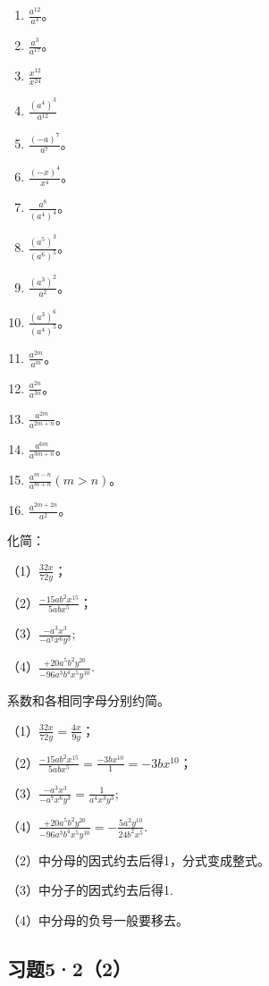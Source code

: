 \begin{enumerate}[start=1]
\item
  \(\frac{a^{12}}{a^4}\)。
\item
  \(\frac{a^3}{a^{17}}\)。
\item
  \(\frac{x^{12}}{x^{24}}\)
\item
  \(\frac{(a^4)^3}{a^{12}}\)
\item
  \(\frac{(-a)^7}{a^7}\)。
\item
  \(\frac{(-x)^4}{x^4}\)。
\item
  \(\frac{a^8}{(a^4)^4}\)。
\item
  \(\frac{(a^5)^3}{(a^6)^5}\)。
\item
  \(\frac{(a^3)^2}{a^2}\)。
\item
  \(\frac{(a^3)^6}{(a^4)^5}\)。
\item
  \(\frac{a^{2m}}{a^m}\)。
\item
  \(\frac{a^{2n}}{a^{3n}}\)。
\item
  \(\frac{a^{2m}}{a^{2m+n}}\)。
\item
  \(\frac{a^{6m}}{a^{3m+n}}\)。
\item
  \(\frac{a^{m - n}}{a^{m + n}} (m > n)\)。
\item
  \(\frac{a^{2m + 2n}}{a^2}\)。
\end{enumerate}

 化简：

（1）\(\frac{32x}{72y}\)；

（2）\(\frac{-15ab^2x^{15}}{5abx^5}\)；

（3）\(\frac{-a^3x^3}{-a^7x^6y^3};\)

（4）\(\frac{+20a^{5}b^{2}y^{20}}{-96a^{3}b^{4}x^{5}y^{10}}.\)

 系数和各相同字母分别约简。

 （1）\(\frac{32x}{72y} = \frac{4x}{9y}\)；

（2）\(\frac{-15ab^2x^{15}}{5abx^5} = \frac{-3bx^{10}}{1} = -3bx^{10}\)；

（3）\(\frac{-a^3x^3}{-a^7x^6y^3} = \frac{1}{a^4x^3y^3};\)

（4）\(\frac{+20a^5b^2y^{20}}{-96a^3b^4x^5y^{10}} = -\frac{5a^2y^{10}}{24b^2x^5}.\)

 （2）中分母的因式约去后得1，分式变成整式。

（3）中分子的因式约去后得1.

（4）中分母的负号一般要移去。

\subsection{习题5·2（2）}

